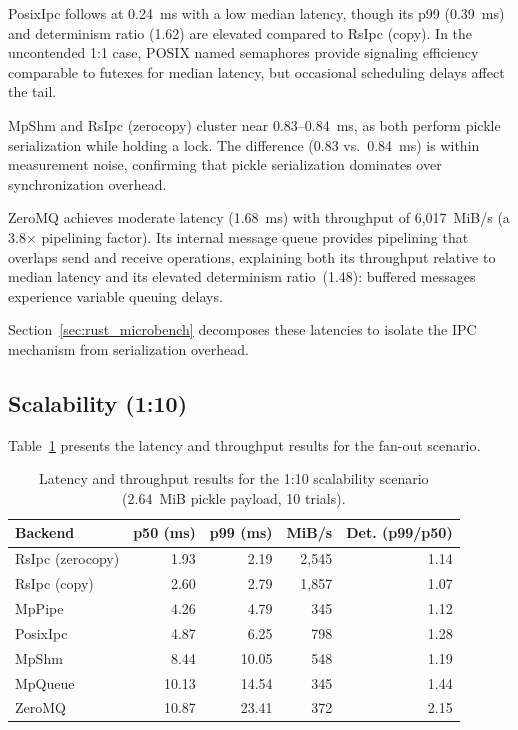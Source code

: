 PosixIpc follows at 0.24~ms with a low median latency, though its p99 (0.39~ms) and determinism ratio (1.62) are elevated compared to RsIpc (copy). In the uncontended 1:1 case, POSIX named semaphores provide signaling efficiency comparable to futexes for median latency, but occasional scheduling delays affect the tail.

MpShm and RsIpc (zerocopy) cluster near 0.83--0.84~ms, as both perform pickle serialization while holding a lock. The difference (0.83 vs.\ 0.84~ms) is within measurement noise, confirming that pickle serialization dominates over synchronization overhead.

ZeroMQ achieves moderate latency (1.68~ms) with throughput of 6{,}017~MiB/s (a 3.8$\times$ pipelining factor). Its internal message queue provides pipelining that overlaps send and receive operations, explaining both its throughput relative to median latency and its elevated determinism ratio~(1.48): buffered messages experience variable queuing delays.

Section~\ref{sec:rust_microbench} decomposes these latencies to isolate the IPC mechanism from serialization overhead.

\bigskip
\subsection{Scalability (1:10)}
\label{subsec:scalability_results}

Table~\ref{tab:scalability_110} presents the latency and throughput results for the fan-out scenario.

\begin{table}[htbp]
    \centering
    \caption{Latency and throughput results for the 1:10 scalability scenario (2.64~MiB pickle payload, 10 trials).}
    \label{tab:scalability_110}
    \begin{tabular}{lrrrr}
        \hline
        \textbf{Backend} & \textbf{p50 (ms)} & \textbf{p99 (ms)} & \textbf{MiB/s} & \textbf{Det. (p99/p50)} \\
        \hline
        RsIpc (zerocopy) & 1.93 & 2.19 & 2,545 & 1.14 \\
        RsIpc (copy) & 2.60 & 2.79 & 1,857 & 1.07 \\
        MpPipe & 4.26 & 4.79 & 345 & 1.12 \\
        PosixIpc & 4.87 & 6.25 & 798 & 1.28 \\
        MpShm & 8.44 & 10.05 & 548 & 1.19 \\
        MpQueue & 10.13 & 14.54 & 345 & 1.44 \\
        ZeroMQ & 10.87 & 23.41 & 372 & 2.15 \\
        \hline
    \end{tabular}
\end{table}

